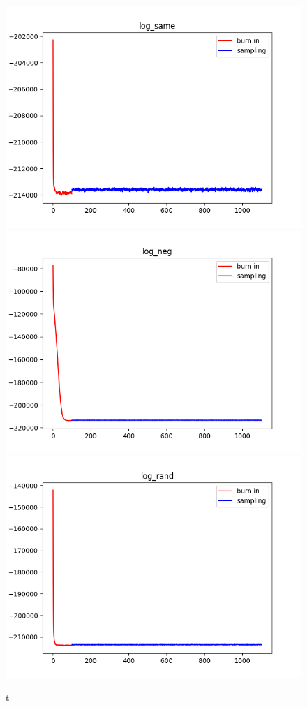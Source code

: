 \documentclass[12pt]{article}
\begin{document}
\begin{enumerate}[label=(\alph*)]
\begin{figure}[h!]
\centering
\includegraphics[scale=0.5]{programming/log_same.png}
\includegraphics[scale=0.5]{programming/log_neg.png}
\includegraphics[scale=0.5]{programming/log_rand.png}
\caption{t}
\label{fig:log_energies}
\end{figure}


\end{enumerate}
\end{document}
